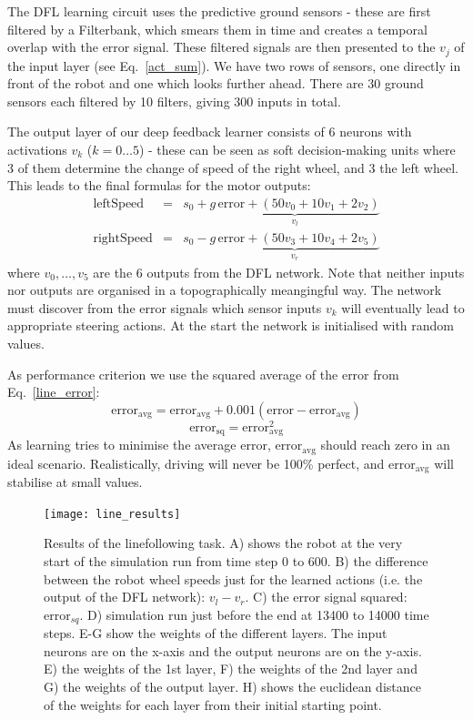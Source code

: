 \documentclass{llncs}
\begin{document}
The DFL learning circuit uses the predictive ground sensors - these
are first filtered by a Filterbank, which smears them in time and
creates a temporal overlap with the error signal. These filtered
signals are then presented to the $v_j$ of the input layer (see
Eq.~\ref{act_sum}). We have two rows of sensors, one directly in front
of the robot and one which looks further ahead. There are 30 ground
sensors each filtered by 10 filters, giving 300 inputs in total.

The output layer of our deep feedback learner consists of 6 neurons
with activations $v_k$ ($k=0 \ldots 5$) - these can be seen as soft
decision-making units where 3 of them determine the change of speed of
the right wheel, and 3 the left wheel. This leads to the
final formulas for the motor outputs:
\begin{eqnarray}
  \mathrm{leftSpeed} &=& s_0 + \underbrace{g\, \mathrm{error} + \left( 50 v_0 + 10 v_1 + 2 v_2 \right)}_{v_l} \\
  \mathrm{rightSpeed} &=& s_0 - \underbrace{g\, \mathrm{error} + \left( 50 v_3 + 10 v_4 + 2 v_5 \right)}_{v_r}
\end{eqnarray}
where $v_0, \ldots, v_5$ are the 6 outputs from the DFL network. Note
that neither inputs nor outputs are organised in a topographically
meangingful way. The network must discover from the error signals
which sensor inputs $v_k$ will eventually lead to appropriate steering
actions. At the start the network is initialised with random values.

As performance criterion we use the squared average of the error from
Eq.~\ref{line_error}:
\begin{equation}
  \mathrm{error}_\mathrm{avg} =  \mathrm{error}_\mathrm{avg} + 0.001 (\mathrm{error} - \mathrm{error}_\mathrm{avg}) 
\end{equation}
\begin{equation}
  \mathrm{error}_\mathrm{sq} =  \mathrm{error}_\mathrm{avg}^2 \label{line_sqerr}
\end{equation}
As learning tries to minimise the average error, $\mathrm{error}_\mathrm{avg}$ should reach zero in an ideal
scenario. Realistically, driving will never be 100\% perfect, and $\mathrm{error}_\mathrm{avg}$
will stabilise at small values.


\begin{figure}[h!]
  \centering
  \texttt{[image: line\_results]}
  \caption{Results of the linefollowing task. A) shows the robot at
    the very start of the simulation run from time step 0 to 600.
    B) the difference between the robot wheel speeds just for the learned
    actions (i.e. the output of the DFL network): $v_l-v_r$.
    C) the error signal squared: $\mathrm{error}_{sq}$.
    D) simulation run just before the end at 13400 to 14000 time steps.
    E-G show the weights of the different layers. The input neurons are on the x-axis
    and the output neurons are on the y-axis.
    E) the weights of the 1st layer, F) the weights of the 2nd layer and
    G) the weights of the output layer.
        H) shows the euclidean distance of the weights for each layer from their initial starting point.
    \label{line_results}}
\end{figure}
\end{document}
